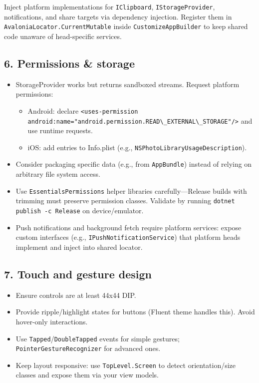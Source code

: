 Inject platform implementations for
\passthrough{\lstinline!IClipboard!},
\passthrough{\lstinline!IStorageProvider!}, notifications, and share
targets via dependency injection. Register them in
\passthrough{\lstinline!AvaloniaLocator.CurrentMutable!} inside
\passthrough{\lstinline!CustomizeAppBuilder!} to keep shared code
unaware of head-specific services.

\subsection{6. Permissions \& storage}\label{permissions-storage}

\begin{itemize}
\tightlist
\item
  StorageProvider works but returns sandboxed streams. Request platform
  permissions:

  \begin{itemize}
  \tightlist
  \item
    Android: declare
    \passthrough{\lstinline!<uses-permission android:name="android.permission.READ\_EXTERNAL\_STORAGE"/>!}
    and use runtime requests.
  \item
    iOS: add entries to Info.plist (e.g.,
    \passthrough{\lstinline!NSPhotoLibraryUsageDescription!}).
  \end{itemize}
\item
  Consider packaging specific data (e.g., from
  \passthrough{\lstinline!AppBundle!}) instead of relying on arbitrary
  file system access.
\item
  Use \passthrough{\lstinline!EssentialsPermissions!} helper libraries
  carefully---Release builds with trimming must preserve permission
  classes. Validate by running
  \passthrough{\lstinline!dotnet publish -c Release!} on
  device/emulator.
\item
  Push notifications and background fetch require platform services:
  expose custom interfaces (e.g.,
  \passthrough{\lstinline!IPushNotificationService!}) that platform
  heads implement and inject into shared locator.
\end{itemize}

\subsection{7. Touch and gesture design}\label{touch-and-gesture-design}

\begin{itemize}
\tightlist
\item
  Ensure controls are at least 44x44 DIP.
\item
  Provide ripple/highlight states for buttons (Fluent theme handles
  this). Avoid hover-only interactions.
\item
  Use
  \passthrough{\lstinline!Tapped!}/\passthrough{\lstinline!DoubleTapped!}
  events for simple gestures;
  \passthrough{\lstinline!PointerGestureRecognizer!} for advanced ones.
\item
  Keep layout responsive: use \passthrough{\lstinline!TopLevel.Screen!}
  to detect orientation/size classes and expose them via your view
  models.
\end{itemize}

